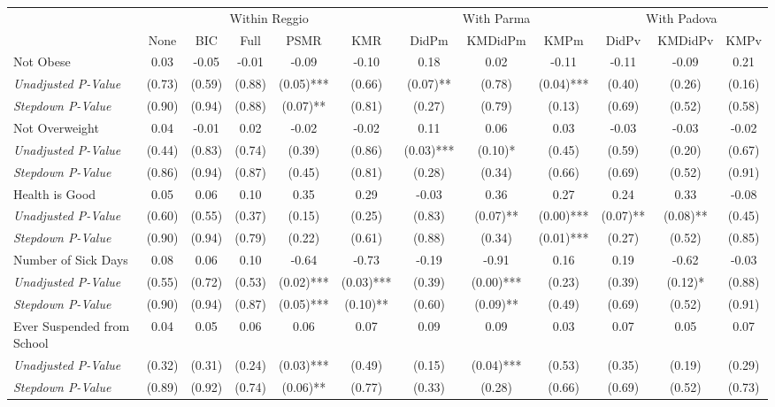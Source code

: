 \begin{tabular}{l c c c c c c c c c c c}
\toprule
& \multicolumn{5}{c}{Within Reggio} & \multicolumn{3}{c}{With Parma} & \multicolumn{3}{c}{With Padova} \\\cmidrule(lr){2-6} \cmidrule(lr){7-9} \cmidrule(lr){10-12}
 & None & BIC & Full & PSMR & KMR & DidPm & KMDidPm & KMPm & DidPv & KMDidPv & KMPv \\
\midrule
Not Obese & 0.03 & -0.05 & -0.01 & -0.09 & -0.10 & 0.18 & 0.02 & -0.11 & -0.11 & -0.09 & 0.21 \\
\quad \textit{Unadjusted P-Value} & (0.73) & (0.59) & (0.88) & (0.05)*** & (0.66) & (0.07)** & (0.78) & (0.04)*** & (0.40) & (0.26) & (0.16) \\
\quad \textit{Stepdown P-Value} & (0.90) & (0.94) & (0.88) & (0.07)** & (0.81) & (0.27) & (0.79) & (0.13) & (0.69) & (0.52) & (0.58) \\
Not Overweight & 0.04 & -0.01 & 0.02 & -0.02 & -0.02 & 0.11 & 0.06 & 0.03 & -0.03 & -0.03 & -0.02 \\
\quad \textit{Unadjusted P-Value} & (0.44) & (0.83) & (0.74) & (0.39) & (0.86) & (0.03)*** & (0.10)* & (0.45) & (0.59) & (0.20) & (0.67) \\
\quad \textit{Stepdown P-Value} & (0.86) & (0.94) & (0.87) & (0.45) & (0.81) & (0.28) & (0.34) & (0.66) & (0.69) & (0.52) & (0.91) \\
Health is Good & 0.05 & 0.06 & 0.10 & 0.35 & 0.29 & -0.03 & 0.36 & 0.27 & 0.24 & 0.33 & -0.08 \\
\quad \textit{Unadjusted P-Value} & (0.60) & (0.55) & (0.37) & (0.15) & (0.25) & (0.83) & (0.07)** & (0.00)*** & (0.07)** & (0.08)** & (0.45) \\
\quad \textit{Stepdown P-Value} & (0.90) & (0.94) & (0.79) & (0.22) & (0.61) & (0.88) & (0.34) & (0.01)*** & (0.27) & (0.52) & (0.85) \\
Number of Sick Days & 0.08 & 0.06 & 0.10 & -0.64 & -0.73 & -0.19 & -0.91 & 0.16 & 0.19 & -0.62 & -0.03 \\
\quad \textit{Unadjusted P-Value} & (0.55) & (0.72) & (0.53) & (0.02)*** & (0.03)*** & (0.39) & (0.00)*** & (0.23) & (0.39) & (0.12)* & (0.88) \\
\quad \textit{Stepdown P-Value} & (0.90) & (0.94) & (0.87) & (0.05)*** & (0.10)** & (0.60) & (0.09)** & (0.49) & (0.69) & (0.52) & (0.91) \\
Ever Suspended from School & 0.04 & 0.05 & 0.06 & 0.06 & 0.07 & 0.09 & 0.09 & 0.03 & 0.07 & 0.05 & 0.07 \\
\quad \textit{Unadjusted P-Value} & (0.32) & (0.31) & (0.24) & (0.03)*** & (0.49) & (0.15) & (0.04)*** & (0.53) & (0.35) & (0.19) & (0.29) \\
\quad \textit{Stepdown P-Value} & (0.89) & (0.92) & (0.74) & (0.06)** & (0.77) & (0.33) & (0.28) & (0.66) & (0.69) & (0.52) & (0.73) \\
\bottomrule
\end{tabular}
